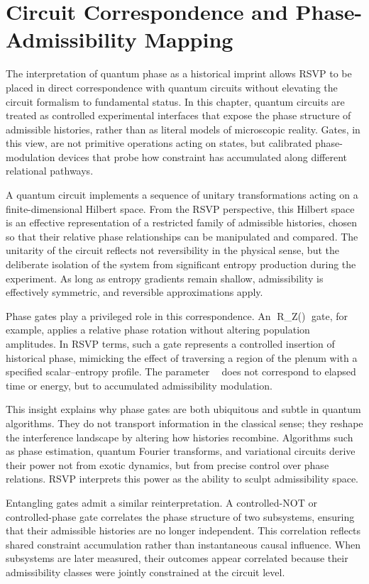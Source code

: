 \documentclass[11pt,oneside]{book}
\begin{document}
\chapter{Circuit Correspondence and Phase-Admissibility Mapping}

The interpretation of quantum phase as a historical imprint allows RSVP to be placed in direct correspondence with quantum circuits without elevating the circuit formalism to fundamental status. In this chapter, quantum circuits are treated as controlled experimental interfaces that expose the phase structure of admissible histories, rather than as literal models of microscopic reality. Gates, in this view, are not primitive operations acting on states, but calibrated phase-modulation devices that probe how constraint has accumulated along different relational pathways.

A quantum circuit implements a sequence of unitary transformations acting on a finite-dimensional Hilbert space. From the RSVP perspective, this Hilbert space is an effective representation of a restricted family of admissible histories, chosen so that their relative phase relationships can be manipulated and compared. The unitarity of the circuit reflects not reversibility in the physical sense, but the deliberate isolation of the system from significant entropy production during the experiment. As long as entropy gradients remain shallow, admissibility is effectively symmetric, and reversible approximations apply.

Phase gates play a privileged role in this correspondence. An R_Z(\theta) gate, for example, applies a relative phase rotation without altering population amplitudes. In RSVP terms, such a gate represents a controlled insertion of historical phase, mimicking the effect of traversing a region of the plenum with a specified scalar–entropy profile. The parameter \theta does not correspond to elapsed time or energy, but to accumulated admissibility modulation.

This insight explains why phase gates are both ubiquitous and subtle in quantum algorithms. They do not transport information in the classical sense; they reshape the interference landscape by altering how histories recombine. Algorithms such as phase estimation, quantum Fourier transforms, and variational circuits derive their power not from exotic dynamics, but from precise control over phase relations. RSVP interprets this power as the ability to sculpt admissibility space.

Entangling gates admit a similar reinterpretation. A controlled-NOT or controlled-phase gate correlates the phase structure of two subsystems, ensuring that their admissible histories are no longer independent. This correlation reflects shared constraint accumulation rather than instantaneous causal influence. When subsystems are later measured, their outcomes appear correlated because their admissibility classes were jointly constrained at the circuit level.
\end{document}
